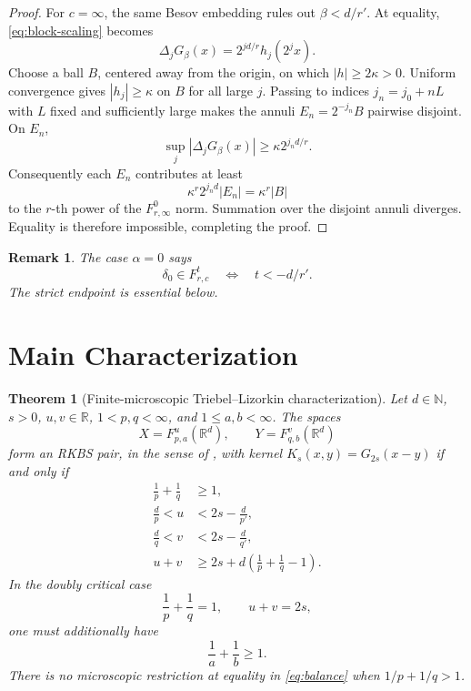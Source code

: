 \documentclass[11pt]{article}
\newtheorem{theorem}{Theorem}
\newtheorem{remark}{Remark}
\newcommand{\R}{\mathbb R}
\newcommand{\Fsp}[3]{F^{#1}_{#2,#3}}
\begin{document}
\begin{proof}
For $c=\infty$, the same Besov embedding rules out
$\beta<d/r'$.  At equality, \eqref{eq:block-scaling} becomes
\[
  \Delta_jG_\beta(x)=2^{jd/r}h_j(2^jx).
\]
Choose a ball $B$, centered away from the origin, on which
$|h|\geq2\kappa>0$.  Uniform convergence gives
$|h_j|\geq\kappa$ on $B$ for all large $j$.  Passing to indices
$j_n=j_0+nL$ with $L$ fixed and sufficiently large makes the annuli
$E_n=2^{-j_n}B$ pairwise disjoint.  On $E_n$,
\[
  \sup_j|\Delta_jG_\beta(x)|
  \geq \kappa 2^{j_nd/r}.
\]
Consequently each $E_n$ contributes at least
\[
  \kappa^r2^{j_nd}|E_n|=\kappa^r|B|
\]
to the $r$-th power of the $\Fsp{0}{r}{\infty}$ norm.  Summation over
the disjoint annuli diverges.  Equality is therefore impossible, completing
the proof.
\end{proof}

\begin{remark}
The case $\alpha=0$ says
\[
  \delta_0\in\Fsp{t}{r}{c}
  \quad\Longleftrightarrow\quad t<-d/r'.
\]
The strict endpoint is essential below.
\end{remark}

\section*{Main Characterization}

\begin{theorem}[Finite-microscopic Triebel--Lizorkin characterization]
\label{thm:main}
Let $d\in\mathbb N$, $s>0$, $u,v\in\R$,
$1<p,q<\infty$, and $1\leq a,b<\infty$.  The spaces
\[
  X=\Fsp{u}{p}{a}(\R^d),
  \qquad
  Y=\Fsp{v}{q}{b}(\R^d)
\]
form an RKBS pair, in the sense of \cite{Heeringa}, with kernel
$K_s(x,y)=G_{2s}(x-y)$ if and only if
\begin{align}
  \frac1p+\frac1q&\geq1,
  \label{eq:pq}\\
  \frac dp<u&<2s-\frac d{p'},
  \label{eq:u}\\
  \frac dq<v&<2s-\frac d{q'},
  \label{eq:v}\\
  u+v&\geq
  2s+d\left(\frac1p+\frac1q-1\right).
  \label{eq:balance}
\end{align}
In the doubly critical case
\begin{equation}
  \frac1p+\frac1q=1,
  \qquad u+v=2s,
  \label{eq:doubly-critical}
\end{equation}
one must additionally have
\begin{equation}
  \frac1a+\frac1b\geq1.
  \label{eq:micro}
\end{equation}
There is no microscopic restriction at equality in \eqref{eq:balance}
when $1/p+1/q>1$.
\end{theorem}
\end{document}
